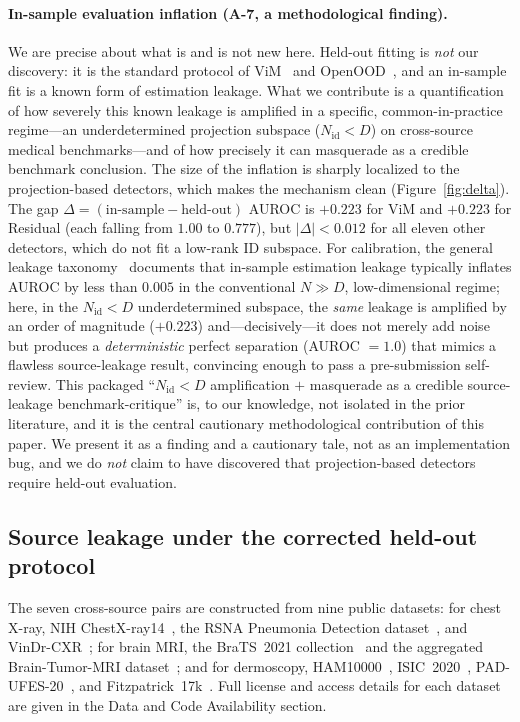 \documentclass{article}
\begin{document}
\paragraph{In-sample evaluation inflation (A-7, a methodological finding).} We
are precise about what is and is not new here. Held-out fitting is \emph{not} our
discovery: it is the standard protocol of ViM~\citep{wang2022vim} and
OpenOOD~\citep{yang2022openood}, and an in-sample fit is a known form of
estimation leakage. What we contribute is a quantification of how severely this
known leakage is amplified in a specific, common-in-practice regime---an
underdetermined projection subspace ($N_\text{id} < D$) on cross-source medical
benchmarks---and of how precisely it can masquerade as a credible benchmark
conclusion. The size of the inflation is sharply localized to the
projection-based detectors, which makes the mechanism clean
(Figure~\ref{fig:delta}). The gap $\Delta = (\text{in-sample} - \text{held-out})$
AUROC is $+0.223$ for ViM and $+0.223$ for Residual (each falling from $1.00$ to
$0.777$), but $|\Delta| < 0.012$ for all eleven other detectors, which do not fit
a low-rank ID subspace. For calibration, the general
leakage taxonomy~\citep{roth2026leakage} documents that in-sample estimation
leakage typically inflates AUROC by less than $0.005$ in the conventional
$N \gg D$, low-dimensional regime; here, in the $N_\text{id} < D$ underdetermined
subspace, the \emph{same} leakage is amplified by an order of magnitude
($+0.223$) and---decisively---it does not merely add noise but produces a
\emph{deterministic} perfect separation (AUROC $=1.0$) that mimics a flawless
source-leakage result, convincing enough to pass a pre-submission self-review.
This packaged ``$N_\text{id} < D$ amplification $+$ masquerade as a credible
source-leakage benchmark-critique'' is, to our knowledge, not isolated in the
prior literature, and it is the central cautionary methodological contribution of
this paper. We present it as a finding and a cautionary tale, not as an
implementation bug, and we do \emph{not} claim to have discovered that
projection-based detectors require held-out evaluation.

\subsection{Source leakage under the corrected held-out protocol}

The seven cross-source pairs are constructed from nine public datasets: for
chest X-ray, NIH ChestX-ray14~\citep{wang2017chestxray8}, the RSNA Pneumonia
Detection dataset~\citep{rsna2018pneumonia,shih2019augmenting}, and
VinDr-CXR~\citep{nguyen2022vindrcxr}; for brain MRI, the BraTS~2021
collection~\citep{baid2021brats,menze2015brats,bakas2017advancing,baid2021bratstcia}
and the aggregated Brain-Tumor-MRI dataset~\citep{nickparvar2021braintumormri,cheng2015braintumor};
and for dermoscopy, HAM10000~\citep{tschandl2018ham10000}, ISIC~2020~\citep{rotemberg2021isic2020},
PAD-UFES-20~\citep{pacheco2020padufes20}, and Fitzpatrick~17k~\citep{groh2021fitzpatrick17k}.
Full license and access details for each dataset are given in the Data and Code
Availability section.
\end{document}
